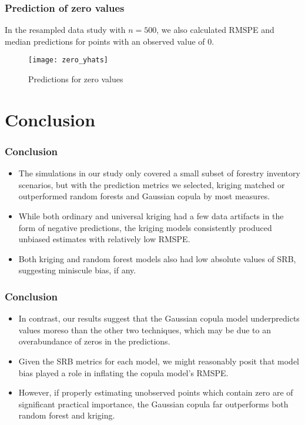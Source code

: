 \documentclass{beamer}
\begin{document}
\begin{frame}
	\frametitle{Prediction of zero values}
	In the resampled data study with $n = 500$, we also calculated RMSPE and median predictions for points with an observed value of 0.
	\begin{figure}[h]
		\centering
	\texttt{[image: zero\_yhats]}
	\caption{\label{fig:zero_yhats}Predictions for zero values}
	\end{figure}
	\begin{center}
	\end{center}
\end{frame}

\section{Conclusion}
\begin{frame}
	\frametitle{Conclusion}
	\begin{itemize}
	\item The simulations in our study only covered a small subset of forestry inventory scenarios, but with the prediction metrics we selected, kriging matched or outperformed random forests and Gaussian copula by most measures.
	\item While both ordinary and universal kriging had a few data artifacts in the form of negative predictions, the kriging models consistently produced unbiased estimates with relatively low RMSPE.
	\item Both kriging and random forest models also had low absolute values of SRB, suggesting miniscule bias, if any. 
	\end{itemize}
\end{frame}

\begin{frame}
	\frametitle{Conclusion}
	\begin{itemize}
	\item In contrast, our results suggest that the Gaussian copula model underpredicts values moreso than the other two techniques, which may be due to an overabundance of zeros in the predictions.
	\item Given the SRB metrics for each model, we might reasonably posit that model bias played a role in inflating the copula model's RMSPE.
	\item However, if properly estimating unobserved points which contain zero are of significant practical importance, the Gaussian copula far outperforms both random forest and kriging.
	\end{itemize}
\end{frame}
\end{document}
